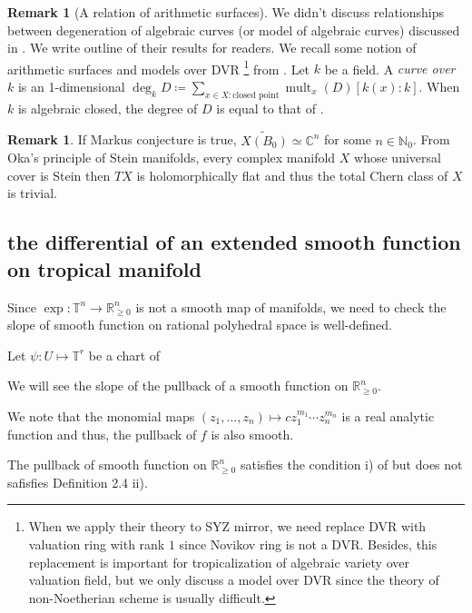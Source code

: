\documentclass[a4paper,dvipdfmx,reqno,12pt]{amsart}
\makeatletter
\newcommand{\ind}[2]{\emph{#1}\index{1{#2}@{#1}}}
\theoremstyle{definition}
\newtheorem{Rmk}[Thm]{Remark}
\newcommand{\deq}{\coloneqq}
\newcommand{\C}{\mathbb{C}}%
\newcommand{\R}{\mathbb{R}}%
\newcommand{\N}{\mathbb{N}_{0}}%
\newcommand{\mb}[1]{\mathbb{#1}}%
\newcommand{\opn}[1]{\operatorname{#1}}
\numberwithin{equation}{section}
\makeatother
\begin{document}
\begin{Rmk}[A relation of arithmetic surfaces]
  We didn't discuss relationships between degeneration of algebraic curves (or model of algebraic curves) discussed in \cite{MR2448666,MR4131998,MR4251610}. We write outline of their results for readers. We recall some notion of arithmetic surfaces and models over DVR \footnote{When we apply their theory to SYZ mirror, we need replace DVR with valuation ring with rank $1$ since Novikov ring is not a DVR. Besides, this replacement is important for tropicalization of algebraic variety over valuation field, but we only discuss a model over DVR since the theory of non-Noetherian scheme is usually difficult.} from \cite[Chapter 9]{MR1917232}.
  Let $k$ be a field.
  A \ind{curve over $k$}{curve over k} is an 1-dimensional
  $\opn{deg}_k D\deq \sum_{x \in X: \text{closed point}}\opn{mult}_{x}(D)[k(x):k]$.
  When $k$ is algebraic closed, the degree of $D$ is equal to that of \cite[p.]{hartshorneAlgebraicGeometry1977a}.

\end{Rmk}

\small

\begin{Rmk}
  If Markus conjecture is true, $\widetilde{X(B_0)}\simeq \C^{n}$
  for some $n\in \N$. From Oka's principle of Stein manifolds,
  every complex manifold $X$ whose universal cover is Stein
  then $TX$ is holomorphically flat and thus the total Chern class of $X$
  is trivial.
\end{Rmk}




\subsection{the differential of an extended 
smooth function on tropical manifold}

Since $\opn{exp}:\mb{T}^{n}\to \R_{\geq 0}^{n}$ is not 
a smooth map of manifolds, we need to check the slope of 
smooth function on rational polyhedral space is well-defined.

Let $\psi\colon U\mapsto \mb{T}^{r}$ be a chart of 

We will see the slope of the pullback of a smooth 
function on $\R_{\geq 0}^{n}$.

We note that the monomial maps 
$(z_1,\ldots,z_n)\mapsto cz_1^{m_1}\cdots z_n^{m_n}$ is a real 
analytic function and thus, the pullback of $f$ is also 
smooth.

The pullback of smooth function on $\R_{\geq 0}^{n}$ satisfies
the condition i) of \cite[Definition 2.4]{MR3903579} 
but does not safisfies Definition 2.4 ii).
\end{document}

